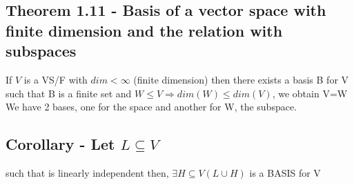 \documentclass{article}
\begin{document}
\subsection*{Theorem 1.11 - Basis of a vector space with finite dimension and the relation with subspaces}
If \(V\) is a VS/F with \(dim<\infty\) (finite dimension) then there exists a basis B for V such that B is a finite set and \(W\leq V \Rightarrow dim (W) \leq dim(V)\), we obtain V=W
\\

We have 2 bases, one for the space and another for W, the subspace.

\subsection{Corollary - Let \(L \subseteq V\)} such that is linearly independent then, \(\exists H \subseteq V (L \cup H )\) is a BASIS for V
\end{document}
